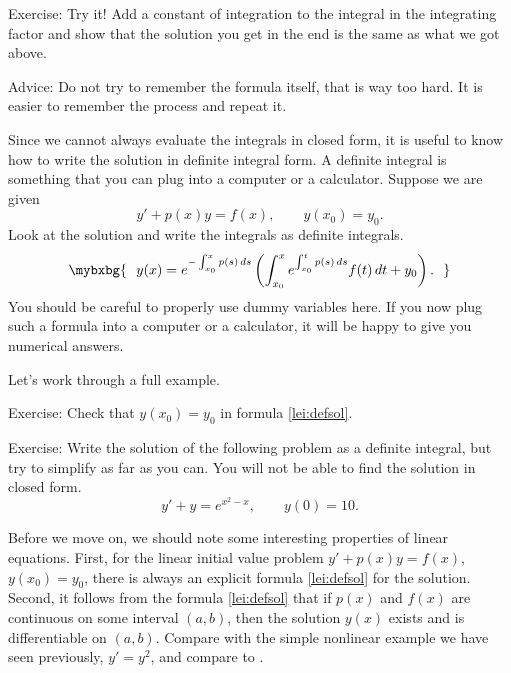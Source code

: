 Exercise: Try it!  Add a constant of integration to the integral in
the integrating factor and show that the solution you get in the end is the
same as what we got above.


Advice: Do not try to remember the formula itself, that is way too
hard.  It is easier to remember the process and repeat it.

Since we cannot always evaluate the integrals in closed form, it is useful to
know how to write the solution in definite integral form.  A definite
integral is something that
you can plug into a computer or a calculator.  Suppose we are given
\begin{equation*}
y' + p(x) y = f(x) , \qquad y(x_0) = y_0 .
\end{equation*}
Look at the solution and write the integrals
as definite integrals.
\begin{equation} \label{lei:defsol}
\mybxbg{
~~
y(x) = e^{-\int_{x_0}^x p(s)\, ds} \left( \int_{x_0}^x e^{\int_{x_0}^t p(s)\, ds}
f(t) \,dt + y_0 \right).
~~
}
\end{equation}
You should
be careful to properly use dummy variables here.  If you now plug such a
formula into a
computer or a calculator, it will be happy to give you numerical answers.

\begin{video}
    Let's work through a full example. 
\end{video}

Exercise: Check that $y(x_0) = y_0$ in formula \eqref{lei:defsol}.


Exercise: Write the solution of the following problem
as a definite integral, but try to simplify as far as you can.  You will not
be able to find the solution in closed form.
\begin{equation*}
y' + y = e^{x^2-x}, \qquad y(0) = 10 .
\end{equation*}


\begin{remark}
Before we move on, we should note some interesting properties of linear
equations.  First, for the linear initial value problem
$y' + p(x) y = f(x)$, $y(x_0) = y_0$,
there is always an explicit formula \eqref{lei:defsol} for the
solution.  Second, it follows
from the formula \eqref{lei:defsol} that if $p(x)$
and $f(x)$ are continuous on some interval $(a,b)$, then the 
solution $y(x)$ exists and is differentiable on $(a,b)$.  Compare
with the simple nonlinear example we have seen previously, $y'=y^2$,
and compare to .
\end{remark}



